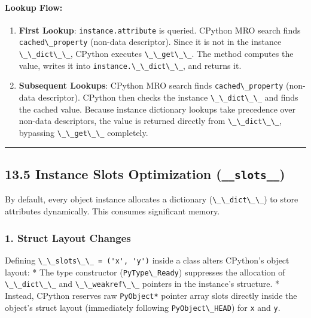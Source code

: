 \hypertarget{lookup-flow}{%
\paragraph{Lookup Flow:}\label{lookup-flow}}

\begin{enumerate}
\def\labelenumi{\arabic{enumi}.}
\tightlist
\item
  \textbf{First Lookup}: \passthrough{\lstinline!instance.attribute!} is
  queried. CPython MRO search finds
  \passthrough{\lstinline!cached\_property!} (non-data descriptor).
  Since it is not in the instance
  \passthrough{\lstinline!\_\_dict\_\_!}, CPython executes
  \passthrough{\lstinline!\_\_get\_\_!}. The method computes the value,
  writes it into \passthrough{\lstinline!instance.\_\_dict\_\_!}, and
  returns it.
\item
  \textbf{Subsequent Lookups}: CPython MRO search finds
  \passthrough{\lstinline!cached\_property!} (non-data descriptor).
  CPython then checks the instance
  \passthrough{\lstinline!\_\_dict\_\_!} and finds the cached value.
  Because instance dictionary lookups take precedence over non-data
  descriptors, the value is returned directly from
  \passthrough{\lstinline!\_\_dict\_\_!}, bypassing
  \passthrough{\lstinline!\_\_get\_\_!} completely.
\end{enumerate}

\begin{center}\rule{0.5\linewidth}{0.5pt}\end{center}

\hypertarget{instance-slots-optimization-__slots__}{%
\subsection{\texorpdfstring{13.5 Instance Slots Optimization
(\texttt{\_\_slots\_\_})}{13.5 Instance Slots Optimization (\_\_slots\_\_)}}\label{instance-slots-optimization-__slots__}}

By default, every object instance allocates a dictionary
(\passthrough{\lstinline!\_\_dict\_\_!}) to store attributes
dynamically. This consumes significant memory.

\hypertarget{struct-layout-changes}{%
\subsubsection{1. Struct Layout Changes}\label{struct-layout-changes}}

Defining \passthrough{\lstinline!\_\_slots\_\_ = ('x', 'y')!} inside a
class alters CPython's object layout: * The type constructor
(\passthrough{\lstinline!PyType\_Ready!}) suppresses the allocation of
\passthrough{\lstinline!\_\_dict\_\_!} and
\passthrough{\lstinline!\_\_weakref\_\_!} pointers in the instance's
structure. * Instead, CPython reserves raw
\passthrough{\lstinline!PyObject*!} pointer array slots directly inside
the object's struct layout (immediately following
\passthrough{\lstinline!PyObject\_HEAD!}) for
\passthrough{\lstinline!x!} and \passthrough{\lstinline!y!}.

